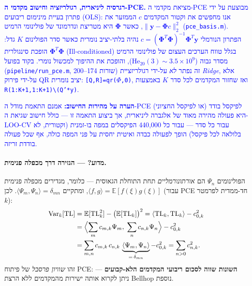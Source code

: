 \documentclass[12pt,a4paper]{article}
\newcommand{\Var}{\mathrm{Var}}
\newcommand{\TL}{\mathrm{TL}}
\DeclareRobustCommand{\aiedit}[1]{\textcolor{blue}{#1}}
\begin{document}
\aiedit{\textbf{רגרסיה ליניארית, רגולריזציה וחישוב מקדמי ה-PCE.}
מציאת מקדמי ה-PCE מבוצעת על ידי פתרון בעיית מינימום ריבועים (OLS):
אנו מחפשים את וקטור המקדמים $c$ הממזער את $\|\mathbf{y}-\boldsymbol{\Phi}c\|_2^2$,
כאשר $\boldsymbol{\Phi}$ היא מטריצת ונדרמונד של פולינומי הרמיט (\texttt{pce\_basis.m}).
הפתרון הנורמלי $c=(\boldsymbol{\Phi}^T\boldsymbol{\Phi})^{-1}\boldsymbol{\Phi}^T\mathbf{y}$
נהיה בלתי-יציב נומרית כאשר סדר הפולינום $K$ גדל: $\boldsymbol{\Phi}^T\boldsymbol{\Phi}$
הופכת סינגולרית (Ill-conditioned) בגלל טווח הערכים העצום של פולינומי הרמיט מסדר גבוה
($\mathrm{He}_{20}(3)\!\sim\!3.5\times10^9$), והופכת את ההיפוך למכשול נומרי.
בקוד בפועל (\texttt{pipeline/run\_pce.m}, שורות 174--200) זה נפתר \emph{לא} על-ידי
רגולריזציית \emph{Ridge}, אלא על-ידי פירוק QR יציב נומרית: \texttt{[Q,R]=qr($\Phi$,0)},
ואז שחזור המקדמים לכל סדר $K$ באמצעות \texttt{R(1:K+1,1:K+1)\textbackslash{}(Q'*y)}.}

\aiedit{\textbf{הערה על מהירות החישוב:} אמנם התאמת מודל ה-PCE לפיקסל בודד (או לפיקסל החציוני)
היא פעולה מהירה מאוד של אלגברה ליניארית, אך ביצוע התאמה זו — כולל חישוב שגיאת
ה-LOO-CV עבור כל סדר — עבור כל 440{,}000 הפיקסלים במפה בו-זמנית (וקטורית, לא בלולאה
לכל פיקסל) הופך לפעולה כבדה ואיטית יחסית על פני המפה כולה, אף שכל פעולה בודדת זריזה.}

\paragraph{מדוע? — הגזירה דרך מכפלה פנימית.}
הפולינומים $\Psi_n$ הם \emph{אורתונורמליים} תחת התוחלת הגאוסית —
כלומר, מגדירים מכפלה פנימית
$\langle f,g\rangle = \mathbb{E}[f(\xi)g(\xi)]$,
ומתקיים
$\langle \Psi_m, \Psi_n \rangle = \delta_{mn}$.
לכן (עבור PCE חד-ממדית לפרמטר $k$):
\begin{align}
  \Var_k[\TL]
  &= \mathbb{E}[\TL_k^2] - \bigl(\mathbb{E}[\TL_k]\bigr)^2
   = \langle \TL_k,\TL_k \rangle - c_{0,k}^2 \notag\\
  &= \Bigl\langle \sum_m c_{m,k}\Psi_m,\; \sum_n c_{n,k}\Psi_n \Bigr\rangle - c_{0,k}^2 \notag\\
  &= \sum_{m,n} c_{m,k}\,c_{n,k}\,\underbrace{\langle\Psi_m,\Psi_n\rangle}_{=\,\delta_{mn}} - c_{0,k}^2
   = \sum_{n>0} c_{n,k}^2.
  \label{eq:pce_parseval}
\end{align}
זהו \emph{שוויון פרסבל} של פיתוח PCE:
\textbf{השונות שווה לסכום ריבועי המקדמים הלא-קבועים} —
ניתן לקרוא אותה ישירות מהמקדמים ללא הרצת \textenglish{Bellhop} נוספת.
\end{document}
